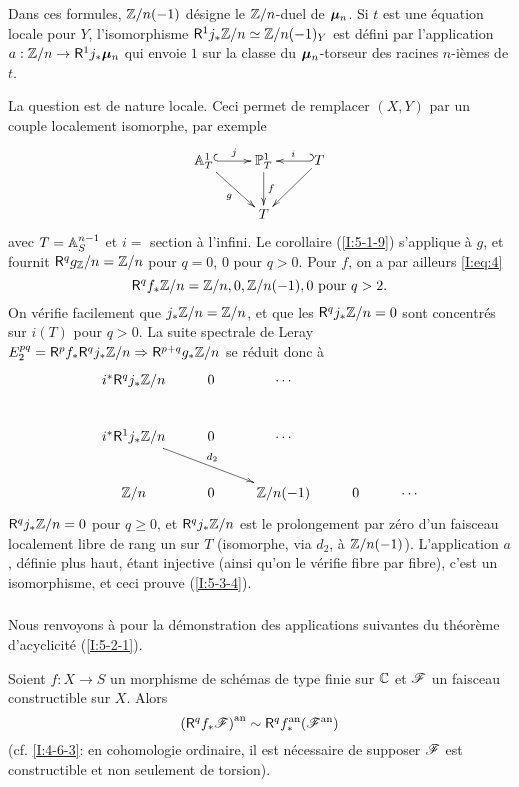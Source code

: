 \documentclass[oneside]{book}
\begin{document}
Dans ces formules, $\mathbb{Z}/n(-1)$ désigne le $\mathbb{Z}/n$-duel de ${\bm\mu}_n$. Si $t$ 
est une équation locale pour $Y$, l'isomorphisme 
$\mathsf{R}^1j_*\mathbb{Z}/n\simeq\mathbb{Z}/n(-1)_Y$ est défini par l'application 
$a:\mathbb{Z}/n\to \mathsf{R}^1j_*{\bm\mu}_n$ qui envoie $1$ sur la classe du ${\bm\mu}_n$-torseur des 
racines $n$-ièmes de $t$. 

La question est de nature locale. Ceci permet de remplacer $(X,Y)$ par un 
couple localement isomorphe, par exemple 
\[\xymatrix{
  \dA_T^1 \ar@{^{(}->}[r]^-j \ar[dr]_-g 
    & \dP_T^1 \ar[d]^-f 
    & \ar@{_{(}->}[l]_-i T \ar[dl] \\
  & T
}\]
avec $T=\mathbb{A}_S^{n-1}$ et $i=$ section à l'infini. Le corollaire (\ref{I:5-1-9}) 
s'applique à $g$, et fournit $\mathsf{R}^q g_ {\mathbb{Z}}/n=\mathbb{Z}/n$ pour $q=0$, $0$ pour $q>0$. 
Pour $f$, on a par ailleurs \eqref{I:eq:4}
\[
  \mathsf{R}^q f_* \mathbb{Z}/n = \mathbb{Z}/n,0,\mathbb{Z}/n(-1),0 \text{ pour $q>2$.}
\]
On vérifie facilement que $j_* \mathbb{Z}/n = \mathbb{Z}/n$, et que les $\mathsf{R}^q j_*\mathbb{Z}/n = 0$ 
sont concentrés sur $i(T)$ pour $q>0$. La suite spectrale de Leray 
$E_2^{pq} = \mathsf{R}^p f_* \mathsf{R}^q j_*\mathbb{Z}/n \Rightarrow \mathsf{R}^{p+q}g_* \mathbb{Z}/n$ se réduit 
donc à 
\[\xymatrix{
  i^* \R^q j_* \dZ/n & 0 & \cdots \\
  i^* \R^1 j_* \dZ/n \ar[drr]^-{d_2} & 0 & \cdots \\
  \dZ/n              & 0 & \dZ/n(-1) & 0 & \cdots
}\]
$\mathsf{R}^q j_*\mathbb{Z}/n=0$ pour $q\geqslant 0$, et $\mathsf{R}^q j_*\mathbb{Z}/n$ est le prolongement 
par zéro d'un faisceau localement libre de rang un sur $T$ (isomorphe, via 
$d_2$, à $\mathbb{Z}/n(-1)$). L'application $a$, définie plus haut, étant 
injective (ainsi qu'on le vérifie fibre par fibre), c'est un isomorphisme, et 
ceci prouve (\ref{I:5-3-4}). 





\subsubsection{}\label{I:5-3-5}

Nous renvoyons à \cite[XVI.4,5]{4} pour la démonstration des 
applications suivantes du théorème d'acyclicité (\ref{I:5-2-1}). 





\begin{theorem}\label{I:5-3-6} %
Soient $f:X\to S$ un morphisme de schémas de type finie sur $\mathbb{C}$ et $\mathscr{F}$ un 
faisceau constructible sur $X$. Alors 
\[
  {(\mathsf{R}^q f_*\mathscr{F})}^{\textnormal{an}} \sim \mathsf{R}^q {f}^{\textnormal{an}}_* ({\mathscr{F}}^{\textnormal{an}})
\]
(cf. \ref{I:4-6-3}: en cohomologie ordinaire, il est nécessaire de supposer 
$\mathscr{F}$ est constructible et non seulement de torsion). 
\end{theorem}
\end{document}
